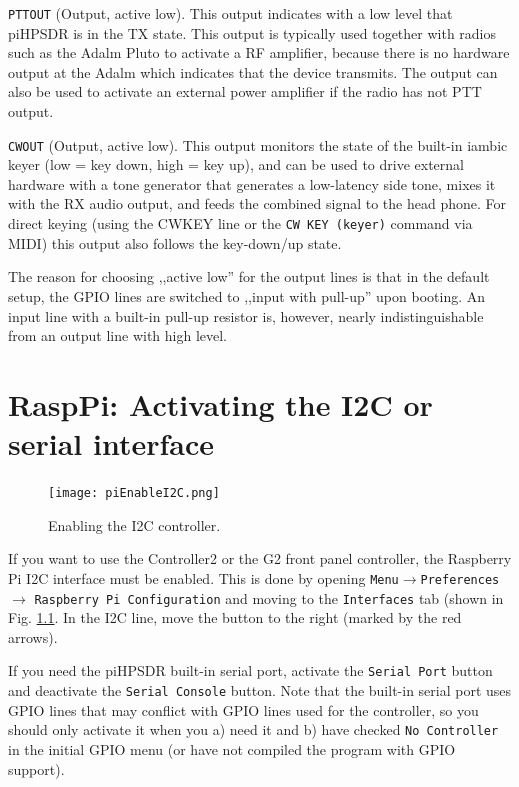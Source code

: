 \documentclass[12pt]{book}
\def\rett#1{\texttt{\color{red}#1}}
\def\bltt#1{\texttt{\color{blue}#1}}
\def\pH{pi\-HPSDR\xspace}
\begin{document}
\rett{PTTOUT} (Output, active low). This output indicates with a low level that \pH is in the
TX state. This output is typically used together with radios such as the Adalm Pluto to activate
a RF amplifier, because there is no hardware output at the Adalm which indicates that the device
transmits. The output can also be used to activate an external power amplifier if the radio has
not PTT output.

\rett{CWOUT} (Output, active low). This output monitors the state of the built-in iambic keyer
(low = key down, high = key up), and can be used to drive external hardware with a tone generator
that generates a low-latency side tone, mixes it with the RX audio output, and feeds the combined
signal to the head phone. For direct keying (using the CWKEY line or the \bltt{CW KEY (keyer)}
command via MIDI) this output also
follows the key-down/up state.

The reason for choosing ,,active low'' for the output lines is that in the default setup,
the GPIO lines are switched
to ,,input with pull-up'' upon booting. An input line with a built-in pull-up
resistor is, however,
nearly indistinguishable from an output line with high level.


\chapter[RaspPi: Activating I2C]{RaspPi: Activating the I2C or serial interface}
\label{sec:i2c}

\begin{figure}[ht]
\center
\texttt{[image: piEnableI2C.png]}
\caption{Enabling the I2C controller.}
\label{fig:piEnableI2C}
\end{figure}

If you want to use the Controller2 or the G2 front panel controller, the Raspberry Pi I2C interface
must be enabled. This is done by opening \texttt{Menu}$\to$\texttt{Preferences}$\to$
\texttt{Raspberry Pi Configuration} and moving to the \texttt{Interfaces} tab
(shown in Fig. \ref{fig:piEnableI2C}. In the I2C line, move the button to the right
(marked by the red arrows).

If you need the \pH built-in serial port, activate the \rett{Serial Port} button and deactivate
the \rett{Serial Console} button. Note that the built-in serial port uses GPIO lines that may
conflict with GPIO lines used for the controller, so
you should only activate it when you a) need it and b) have checked \rett{No Controller} in the
initial GPIO menu (or have not compiled the program with GPIO support).
\end{document}
